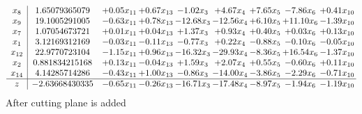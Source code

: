 \documentclass[8pt]{article}
\begin{document}
\[\begin{array}{c| c c@{\hskip 2pt} c@{\hskip 2pt} c@{\hskip 2pt} c@{\hskip 2pt} c@{\hskip 2pt} c@{\hskip 2pt} c@{\hskip 2pt} }
 x_{8}   &  1.65079365079 & +  0.05 x_{11} & +  0.67 x_{13} & -1.02 x_{3} & +  4.67 x_{4} & +  7.65 x_{5} & -7.86 x_{6} & +  0.41 x_{10}\\
 x_{9}   &  19.1005291005 & -0.63 x_{11} & +  0.78 x_{13} & -12.68 x_{3} & -12.56 x_{4} & +  6.10 x_{5} & + 11.10 x_{6} & -1.39 x_{10}\\
 x_{7}   &  1.07054673721 & +  0.01 x_{11} & +  0.04 x_{13} & +  1.37 x_{3} & +  0.93 x_{4} & +  0.40 x_{5} & +  0.03 x_{6} & +  0.13 x_{10}\\
 x_{1}   &  3.12169312169 & -0.03 x_{11} & -0.11 x_{13} & -0.77 x_{3} & +  0.22 x_{4} & -0.88 x_{5} & -0.10 x_{6} & -0.05 x_{10}\\
 x_{12}   &  22.9770723104 & -1.15 x_{11} & +  0.96 x_{13} & -16.32 x_{3} & -29.93 x_{4} & -8.36 x_{5} & + 16.54 x_{6} & -1.37 x_{10}\\
 x_{2}   &  0.881834215168 & +  0.13 x_{11} & -0.04 x_{13} & +  1.59 x_{3} & +  2.07 x_{4} & +  0.55 x_{5} & -0.60 x_{6} & +  0.11 x_{10}\\
 x_{14}   &  4.14285714286 & -0.43 x_{11} & +  1.00 x_{13} & -0.86 x_{3} & -14.00 x_{4} & -3.86 x_{5} & -2.29 x_{6} & -0.71 x_{10}\\
\hline
z    &  -2.63668430335 & -0.65 x_{11} & -0.26 x_{13} & -16.71 x_{3} & -17.48 x_{4} & -8.97 x_{5} & -1.94 x_{6} & -1.19 x_{10}\\
\end{array}\]
 After cutting plane is added 
\end{document}
